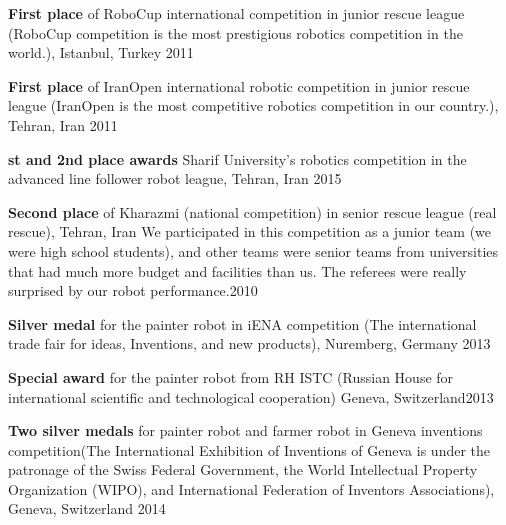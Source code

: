 \documentclass[letterpaper,11pt]{article}
\begin{document}
        \item{\textbf{First place} of RoboCup international competition in junior rescue league (RoboCup competition is the most prestigious robotics competition in the world.), Istanbul, Turkey \hfill 2011}\vspace{-5pt}

        \item{\textbf{First place} of IranOpen international robotic competition in junior rescue league (IranOpen is the most competitive robotics competition in our country.), Tehran, Iran \hfill 2011}\vspace{-5pt}

        \item{\textbf{st and 2nd place awards} Sharif University’s robotics competition in the advanced line follower robot league, Tehran, Iran \hfill 2015}\vspace{-5pt}

        \item{\textbf{Second place} of Kharazmi (national competition) in senior rescue league (real rescue), Tehran, Iran
        {We participated in this competition as a junior team (we were high school students), and other teams were senior teams from universities that had much more budget and facilities than us. The referees were really surprised by our robot performance.}\hfill 2010}\vspace{-5pt}

        \item{\textbf{Silver medal} for the painter robot in iENA competition (The international trade fair for ideas, Inventions, and new products), Nuremberg, Germany \hfill 2013}\vspace{-5pt}

        \item{\textbf{Special award} for the painter robot from RH ISTC (Russian House for international scientific and technological cooperation) Geneva, Switzerland\hfill 2013}\vspace{-5pt}

        \item{\textbf{Two silver medals} for painter robot and farmer robot in Geneva inventions competition(The International Exhibition of Inventions of Geneva is under the patronage of the Swiss Federal Government, the World Intellectual Property Organization (WIPO), and International Federation of Inventors Associations), Geneva, Switzerland \hfill 2014}\vspace{-5pt}
\end{document}
